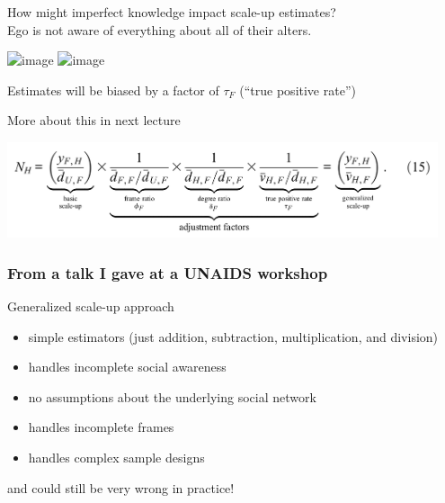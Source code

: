 \documentclass[aspectratio=169]{beamer}
\begin{document}
\begin{frame}

How might imperfect knowledge impact scale-up estimates?\\
Ego is not aware of everything about all of their alters.
\begin{center}
\includegraphics<1>[width=0.7\textwidth]{figures/network-edges-sample-ego-noinfotxerror}
\includegraphics<2>[width=0.7\textwidth]{figures/network-edges-sample-ego-infotxerror-formatt}
\end{center}
\pause
\vfill
Estimates will be biased by a factor of $\tau_F$ (``true positive rate'')

\vfill
More about this in next lecture 

\end{frame}
\begin{frame}

\begin{center}
\includegraphics[width=0.95\textwidth]{figures/feehan_generalizing_2016_eq15}
\end{center}
 
\end{frame}
\begin{frame}
\frametitle{From a talk I gave at a UNAIDS workshop}

Generalized scale-up approach
\begin{itemize}
\item simple estimators (just addition, subtraction, multiplication, and division)
\item handles incomplete social awareness
\item no assumptions about the underlying social network
\item handles incomplete frames
\item handles complex sample designs
\end{itemize}

\vfill
and could still be very wrong in practice!

\end{frame}
\end{document}
